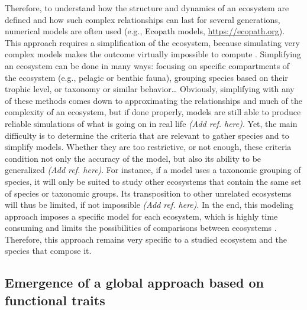 Therefore, to understand how the structure and dynamics of an ecosystem are defined and how such complex relationships can last for several generations, numerical models are often used (e.g., Ecopath models, \url{https://ecopath.org}). This approach requires a simplification of the ecosystem, because simulating very complex models makes the outcome virtually impossible to compute \citep{albouy2011}. Simplifying an ecosystem can be done in many ways: focusing on specific compartments of the ecosystem (e.g., pelagic or benthic fauna), grouping species based on their trophic level, or taxonomy or similar behavior\ldots{} Obviously, simplifying with any of these methods comes down to approximating the relationships and much of the complexity of an ecosystem, but if done properly, models are still able to produce reliable simulations of what is going on in real life \emph{(Add ref. here)}. Yet, the main difficulty is to determine the criteria that are relevant to gather species and to simplify models. Whether they are too restrictive, or not enough, these criteria condition not only the accuracy of the model, but also its ability to be generalized \emph{(Add ref. here)}. For instance, if a model uses a taxonomic grouping of species, it will only be suited to study other ecosystems that contain the same set of species or taxonomic groups. Its transposition to other unrelated ecosystems will thus be limited, if not impossible \emph{(Add ref. here)}. In the end, this modeling approach imposes a specific model for each ecosystem, which is highly time consuming and limits the possibilities of comparisons between ecosystems \citep{martini2020, mcgill2006}. Therefore, this approach remains very specific to a studied ecosystem and the species that compose it. 


\subsection{Emergence of a global approach based on functional traits}

